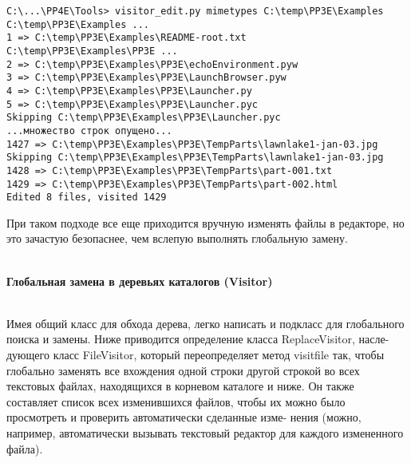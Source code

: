 \documentclass[12pt]{article}
\begin{document}
\begin{verbatim}
C:\...\PP4E\Tools> visitor_edit.py mimetypes C:\temp\PP3E\Examples
C:\temp\PP3E\Examples ...
1 => C:\temp\PP3E\Examples\README-root.txt
C:\temp\PP3E\Examples\PP3E ...
2 => C:\temp\PP3E\Examples\PP3E\echoEnvironment.pyw
3 => C:\temp\PP3E\Examples\PP3E\LaunchBrowser.pyw
4 => C:\temp\PP3E\Examples\PP3E\Launcher.py
5 => C:\temp\PP3E\Examples\PP3E\Launcher.pyc
Skipping C:\temp\PP3E\Examples\PP3E\Launcher.pyc
...множество строк опущено...
1427 => C:\temp\PP3E\Examples\PP3E\TempParts\lawnlake1-jan-03.jpg
Skipping C:\temp\PP3E\Examples\PP3E\TempParts\lawnlake1-jan-03.jpg
1428 => C:\temp\PP3E\Examples\PP3E\TempParts\part-001.txt
1429 => C:\temp\PP3E\Examples\PP3E\TempParts\part-002.html
Edited 8 files, visited 1429
\end{verbatim}
При таком подходе все еще приходится вручную изменять файлы в редакторе, но это зачастую безопаснее, чем вслепую выполнять глобальную замену.\\\\
\begin{large}
\textbf{Глобальная замена в деревьях каталогов (Visitor)} \\\\
\end{large}
Имея общий класс для обхода
дерева, легко написать и подкласс для глобального поиска и замены.
Ниже приводится определение класса ReplaceVisitor, насле-
дующего класс FileVisitor, который переопределяет метод visitfile так,
чтобы глобально заменять все вхождения одной строки другой строкой
во всех текстовых файлах, находящихся в корневом каталоге и ниже.
Он также составляет список всех изменившихся файлов, чтобы их
можно было просмотреть и проверить автоматически сделанные изме-
нения (можно, например, автоматически вызывать текстовый редактор
для каждого измененного файла).
\end{document}
